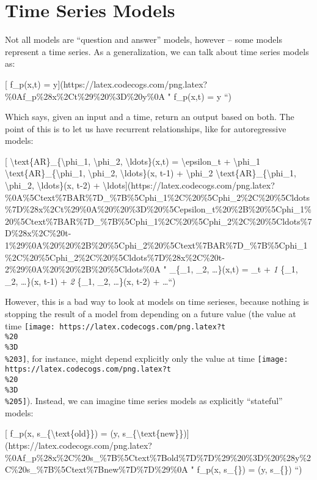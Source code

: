 \documentclass[]{article}
\begin{document}
\hypertarget{time-series-models}{%
\section{Time Series Models}\label{time-series-models}}

Not all models are ``question and answer'' models, however -- some models
represent a time series. As a generalization, we can talk about time series
models as:

{[} f\_p(x,t) =
y{]}(https://latex.codecogs.com/png.latex?\%0Af\_p\%28x\%2Ct\%29\%20\%3D\%20y\%0A
" f\_p(x,t) = y ``)

Which says, given an input and a time, return an output based on both. The point
of this is to let us have recurrent relationships, like for autoregressive
models:

{[} \textbackslash{}text\{AR\}\_\{\textbackslash{}phi\_1,
\textbackslash{}phi\_2, \textbackslash{}ldots\}(x,t) =
\textbackslash{}epsilon\_t + \textbackslash{}phi\_1
\textbackslash{}text\{AR\}\_\{\textbackslash{}phi\_1, \textbackslash{}phi\_2,
\textbackslash{}ldots\}(x, t-1) + \textbackslash{}phi\_2
\textbackslash{}text\{AR\}\_\{\textbackslash{}phi\_1, \textbackslash{}phi\_2,
\textbackslash{}ldots\}(x, t-2) +
\textbackslash{}ldots{]}(https://latex.codecogs.com/png.latex?\%0A\%5Ctext\%7BAR\%7D\_\%7B\%5Cphi\_1\%2C\%20\%5Cphi\_2\%2C\%20\%5Cldots\%7D\%28x\%2Ct\%29\%0A\%20\%20\%3D\%20\%5Cepsilon\_t\%20\%2B\%20\%5Cphi\_1\%20\%5Ctext\%7BAR\%7D\_\%7B\%5Cphi\_1\%2C\%20\%5Cphi\_2\%2C\%20\%5Cldots\%7D\%28x\%2C\%20t-1\%29\%0A\%20\%20\%2B\%20\%5Cphi\_2\%20\%5Ctext\%7BAR\%7D\_\%7B\%5Cphi\_1\%2C\%20\%5Cphi\_2\%2C\%20\%5Cldots\%7D\%28x\%2C\%20t-2\%29\%0A\%20\%20\%2B\%20\%5Cldots\%0A
" \_\{\phi\_1, \phi\_2, \ldots\}(x,t) = \epsilon\_t + \phi\emph{1
}\{\phi\_1, \phi\_2, \ldots\}(x, t-1) + \phi\emph{2
}\{\phi\_1, \phi\_2, \ldots\}(x, t-2) + \ldots ``)

However, this is a bad way to look at models on time serieses, because nothing
is stopping the result of a model from depending on a future value (the value at
time \texttt{[image: https://latex.codecogs.com/png.latex?t\\\%20\\\%3D\\\%203]}, for
instance, might depend explicitly only the value at time
\texttt{[image: https://latex.codecogs.com/png.latex?t\\\%20\\\%3D\\\%205]}). Instead,
we can imagine time series models as explicitly ``stateful'' models:

{[} f\_p(x, s\_\{\textbackslash{}text\{old\}\}) = (y,
s\_\{\textbackslash{}text\{new\}\}){]}(https://latex.codecogs.com/png.latex?\%0Af\_p\%28x\%2C\%20s\_\%7B\%5Ctext\%7Bold\%7D\%7D\%29\%20\%3D\%20\%28y\%2C\%20s\_\%7B\%5Ctext\%7Bnew\%7D\%7D\%29\%0A
" f\_p(x, s\_\{\}) = (y, s\_\{\}) ``)
\end{document}
